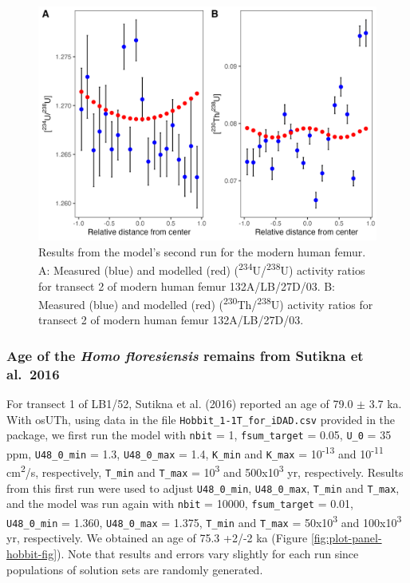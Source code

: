 \documentclass[]{elsarticle} %
\begin{document}
\begin{figure}
\includegraphics[width=1\linewidth]{figures/plot-panel-second-run-modern} \caption{Results from the model's second run for the modern human femur. A: Measured (blue) and modelled (red) (\textsuperscript{234}U/\textsuperscript{238}U) activity ratios for transect 2 of modern human femur 132A/LB/27D/03. B: Measured (blue) and modelled (red) (\textsuperscript{230}Th/\textsuperscript{238}U) activity ratios for transect 2 of modern human femur 132A/LB/27D/03.}\label{fig:plot-panel-second-run-modern-fig}
\end{figure}

\FloatBarrier

\hypertarget{age-of-the-homo-floresiensis-remains-from-sutikna-et-al.-2016}{%
\subsubsection{\texorpdfstring{Age of the \emph{Homo floresiensis} remains from Sutikna et al.~2016}{Age of the Homo floresiensis remains from Sutikna et al.~2016}}\label{age-of-the-homo-floresiensis-remains-from-sutikna-et-al.-2016}}

For transect 1 of LB1/52, Sutikna et al. (2016) reported an age of 79.0 \(\pm\) 3.7 ka. With osUTh, using data in the file \texttt{Hobbit\_1-1T\_for\_iDAD.csv} provided in the package, we first run the model with \texttt{nbit} = 1, \texttt{fsum\_target} = 0.05, \texttt{U\_0} = 35 ppm, \texttt{U48\_0\_min} = 1.3, \texttt{U48\_0\_max} = 1.4, \texttt{K\_min} and \texttt{K\_max} = 10\textsuperscript{-13} and 10\textsuperscript{-11} cm\textsuperscript{2}/s, respectively, \texttt{T\_min} and \texttt{T\_max} = 10\textsuperscript{3} and 500x10\textsuperscript{3} yr, respectively. Results from this first run were used to adjust \texttt{U48\_0\_min}, \texttt{U48\_0\_max}, \texttt{T\_min} and \texttt{T\_max}, and the model was run again with \texttt{nbit} = 10000, \texttt{fsum\_target} = 0.01, \texttt{U48\_0\_min} = 1.360, \texttt{U48\_0\_max} = 1.375, \texttt{T\_min} and \texttt{T\_max} = 50x10\textsuperscript{3} and 100x10\textsuperscript{3} yr, respectively. We obtained an age of 75.3 +2/-2 ka (Figure \ref{fig:plot-panel-hobbit-fig}). Note that results and errors vary slightly for each run since populations of solution sets are randomly generated.
\end{document}

